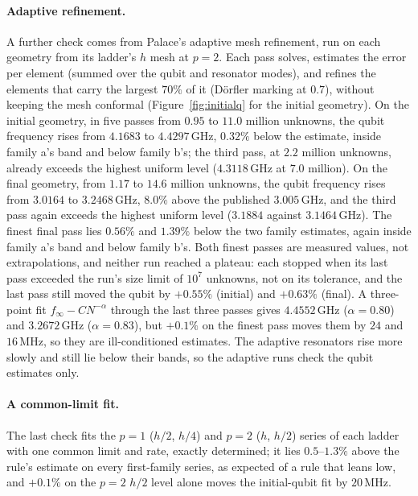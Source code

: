 \documentclass{anvil-paper}
\begin{document}
\paragraph{Adaptive refinement.}
A further check comes from Palace's adaptive mesh refinement, run on each
geometry from its ladder's $h$ mesh at $p = 2$. Each pass solves, estimates
the error per element (summed over the qubit and resonator modes), and
refines the elements that carry the largest $70\%$ of it (D\"orfler
marking at $0.7$), without keeping the mesh conformal
(Figure~\ref{fig:initialq} for the initial geometry). On the initial
geometry, in five passes from $0.95$ to $11.0$ million unknowns, the qubit
frequency rises from $4.1683$ to $4.4297$\,GHz, $0.32\%$ below the estimate, inside
family a's band and below family b's; the third pass, at $2.2$ million unknowns, already exceeds the
highest uniform level ($4.3118$\,GHz at $7.0$ million). On the final
geometry, from $1.17$ to $14.6$ million unknowns, the qubit frequency rises from
$3.0164$ to $3.2468$\,GHz, $8.0\%$ above the published $3.005$\,GHz, and
the third pass again exceeds the highest uniform level ($3.1884$ against
$3.1464$\,GHz). The finest final pass lies $0.56\%$ and $1.39\%$ below the
two family estimates, again inside family a's band and below family b's. Both finest passes are measured
values, not extrapolations, and neither run reached a plateau: each stopped
when its last pass exceeded the run's size limit of $10^7$ unknowns, not on
its tolerance, and the last pass still moved the qubit by $+0.55\%$ (initial)
and $+0.63\%$ (final). A three-point fit $f_\infty - CN^{-\alpha}$ through
the last three passes gives $4.4552$\,GHz ($\alpha = 0.80$) and
$3.2672$\,GHz ($\alpha = 0.83$), but $+0.1\%$ on the finest pass moves
them by $24$ and $16$\,MHz, so they are ill-conditioned estimates. The
adaptive resonators rise more slowly and still lie below their bands, so
the adaptive runs check the qubit estimates only.

\paragraph{A common-limit fit.}
The last check fits the $p = 1$ ($h/2$, $h/4$) and $p = 2$ ($h$, $h/2$)
series of each ladder with one common limit and rate, exactly determined; it lies
$0.5$--$1.3\%$ above the rule's estimate on every first-family series, as
expected of a rule that leans low, and $+0.1\%$ on the $p = 2$ $h/2$ level
alone moves the initial-qubit fit by $20$\,MHz.
\end{document}
